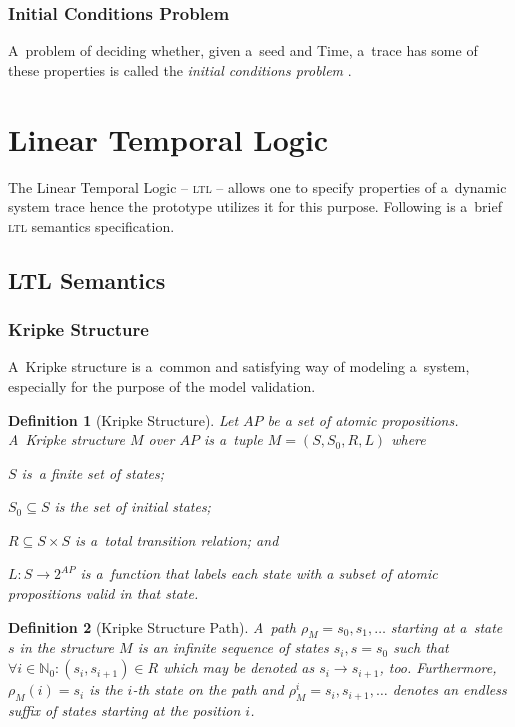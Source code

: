 \documentclass[12pt,oneside,draft]{fithesis}
\newcommand{\mNatural}{\mathbb{N}}
\newtheorem{mydef}{Definition}
\begin{document}
\subsubsection{Initial Conditions Problem}
A~problem of deciding whether, given a~seed and Time, a~trace has some
of these properties is called the \emph{initial conditions problem}
\cite{sven}.

\section{Linear Temporal Logic}
The Linear Temporal Logic -- \textsc{ltl} -- allows one to specify
properties of a~dynamic system trace \cite{sven} hence the prototype
utilizes it for this purpose. Following is a~brief \textsc{ltl}
semantics specification.
\subsection{LTL Semantics}
\subsubsection{Kripke Structure}
A~Kripke structure is a~common and satisfying way of modeling a~system,
especially for the purpose of the model validation\cite{clarke}.
\begin{mydef}[Kripke Structure]
Let ${AP}$ be a set of atomic propositions.
A~Kripke structure\cite{clarke} $M$ over $AP$ is a~tuple
$M=(S, S_0, R, L)$ where
\begin{inparaenum}
	\item{}$S$ is~a finite set of states;
	\item{}$S_0\subseteq{}S$ is the set of initial states;
	\item{}$R\subseteq{}S\times{}S$ is a~total transition relation; and
	\item{}$L:S\rightarrow{}2^{AP}$ is a~function that labels each state
		with a subset of atomic propositions valid in that state.
\end{inparaenum}
\end{mydef}

\begin{mydef}[Kripke Structure Path]
A~path\cite{biere} $\rho_M=s_0,s_1,\dotsc$ starting at a~state
$s$ in the structure $M$ is an infinite sequence of states
$s_i, s = s_0$ such that
$\forall i \in \mNatural_0: (s_i, s_{i+1}) \in R$ which may be denoted
as $s_i\rightarrow s_{i+1}$, too. 
Furthermore, $\rho_M(i)=s_i$ is the $i$-th state on the path and
$\rho_M^i=s_i,s_{i+1},\dotsc$ denotes an endless suffix of states
starting at the position $i$.
\end{mydef}
\end{document}
